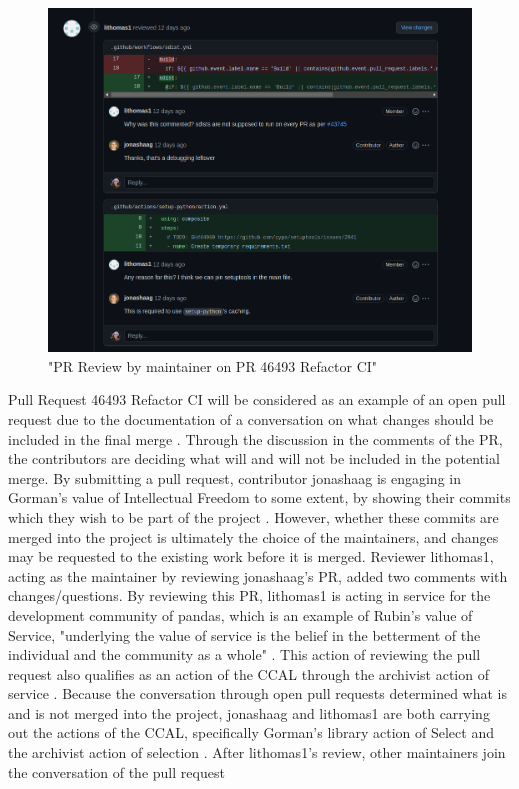 \begin{figure}[hbt!]
\begin{center}
\includegraphics[width=.8\textwidth]{./images/pr_review.png}
\caption{"PR Review by maintainer on PR 46493 Refactor CI"}
\vspace{0in}
\end{center}
\end{figure}

Pull Request 46493 Refactor CI will be considered as an example of an open pull request due to the documentation of a conversation on what changes should be included in the final merge \cite{pandasrepo}. Through the discussion in the comments of the PR, the contributors are deciding what will and will not be included in the potential merge. By submitting a pull request, contributor jonashaag is engaging in Gorman's value of Intellectual Freedom to some extent, by showing their commits which they wish to be part of the project \cite{gorman2000values}. However, whether these commits are merged into the project is ultimately the choice of the maintainers, and changes may be requested to the existing work before it is merged. Reviewer lithomas1, acting as the maintainer by reviewing jonashaag's PR, added two comments with changes/questions. By reviewing this PR, lithomas1 is acting in service for the development community of pandas, which is an example of Rubin's value of Service, "underlying the value of service is the belief in the betterment of the individual and the community as a whole" \cite{rubin2016foundationslis}. This action of reviewing the pull request also qualifies as an action of the CCAL through the archivist action of service \cite{rubin2016foundationslis}. Because the conversation through open pull requests determined what is and is not merged into the project, jonashaag and lithomas1 are both carrying out the actions of the CCAL, specifically Gorman's library action of Select and the archivist action of selection \cite{rubin2016foundationslis} \cite{gorman2000values}. After lithomas1's review, other maintainers join the conversation of the pull request

